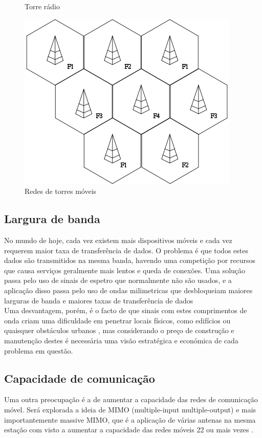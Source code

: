 \documentclass{llncs}
\begin{document}
\begin{figure}[H]
\begin{minipage}{0.45\textwidth}
        \caption{Torre rádio \cite{img1}}
    \end{minipage}\hfill
    \begin{minipage}{0.45\textwidth}
        \centering
        \includegraphics[scale=0.5]{network.png}
        \caption{Redes de torres móveis \cite{img2}}
    \end{minipage}
\end{figure}

\subsection{Largura de banda}
\hspace*{1.5em} No mundo de hoje, cada vez existem mais dispositivos móveis e cada vez requerem maior taxa de transferência de dados. O problema é que todos estes dados são transmitidos na mesma banda, havendo uma competição por recursos que causa serviços geralmente mais lentos e queda de conexões. Uma solução passa pelo uso de sinais de espetro que normalmente não são usados, e a aplicação disso passa pelo uso de ondas milimetricas que desbloqueiam maiores larguras de banda e maiores taxas de transferência de dados \cite{Mis:El} \\
\hspace*{1.5em} Uma desvantagem, porém, é o facto de que sinais com estes comprimentos de onda criam uma dificuldade em penetrar locais físicos, como edifícios ou quaisquer obstáculos urbanos \cite{everything:to:know}, mas considerando o preço de construção e manutenção destes é necessária uma visão estratégica e económica de cada problema em questão.
\subsection{Capacidade de comunicação}
\hspace*{1.5em} Uma outra preocupação é a de aumentar a capacidade das redes de comunicação móvel. Será explorada a ideia de MIMO (multiple-input multiple-output) e mais importantemente massive MIMO, que é a aplicação de várias antenas na mesma estação com visto a aumentar a capacidade das redes móveis 22 ou mais vezes \cite{everything:to:know}.
\end{document}
